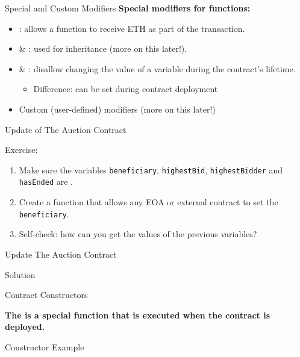 \documentclass[]{beamer}
\begin{document}
\begin{frame}{Special and Custom Modifiers}
\textbf{Special modifiers for functions:}
	\begin{itemize}
		\item<1-> : allows a function to receive ETH as part of the transaction.
		\item<2->  \& : used for inheritance (\textcolor{focus}{more on this later!}).
		\item<3->  \& : disallow changing the value of a variable during the contract's lifetime.
		\begin{itemize}
			\item<3->{Difference:  can be set during contract deployment}	
		\end{itemize}
		\item<4-> Custom (user-defined) modifiers (\textcolor{focus}{more on this later!})
	\end{itemize}
\end{frame}

\begin{frame}{Update of The Auction Contract}
	\begin{exercise}{Exercise:}
		\begin{enumerate}
			\item Make sure the variables \texttt{beneficiary}, \texttt{highestBid}, \texttt{highestBidder} and \texttt{hasEnded} are .
			\item Create a function that allows any EOA or external contract to set the \texttt{beneficiary}.
			\item Self-check: how can you get the values of the previous variables?
		\end{enumerate}
	\end{exercise}
\end{frame}

\begin{frame}{Update The Auction Contract}
	\begin{samplecode}{Solution}
		
	\end{samplecode}
\end{frame}

\begin{frame}{Contract Constructors}

	\textbf{The  is a special function that is executed when the contract is deployed.}
	
	\begin{samplecode}{Constructor Example}
			
	\end{samplecode}
	
\end{frame}
\end{document}
